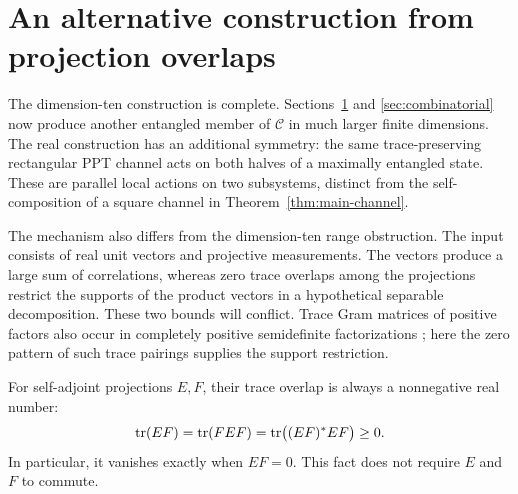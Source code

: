 \section{An alternative construction from projection overlaps}\label{sec:projection}

The dimension-ten construction is complete.  Sections~\ref{sec:projection}
and \ref{sec:combinatorial} now produce another entangled member of
$\mathscr C$ in much larger finite dimensions.  The real construction has
an additional symmetry: the same trace-preserving rectangular PPT channel
acts on both halves of a maximally entangled state.  These are parallel
local actions on two subsystems, distinct from the self-composition of a
square channel in Theorem~\ref{thm:main-channel}.

The mechanism also differs from the dimension-ten range obstruction.
The input consists of real unit vectors and projective measurements.
The vectors produce a large sum of correlations, whereas
zero trace overlaps among the projections restrict the supports of the
product vectors in a hypothetical separable decomposition.  These two
bounds will conflict.  Trace Gram matrices of positive factors also occur
in completely positive semidefinite factorizations
\cite{PSVW2018}; here the zero pattern of such trace pairings supplies the
support restriction.

For self-adjoint projections \(E,F\), their trace overlap is always a
nonnegative real number:
\begin{equation}\label{eq:projection-overlap}
 \operatorname{tr}(EF)=\operatorname{tr}(FEF)=\operatorname{tr}\bigl((EF)^*EF\bigr)\geq0.
\end{equation}
In particular, it vanishes exactly when \(EF=0\).  This fact does not
require \(E\) and \(F\) to commute.

